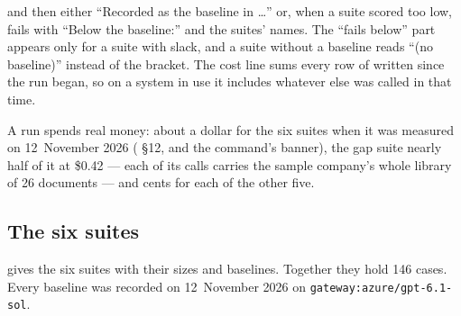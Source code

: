 \noindent and then either \enquote{Recorded as the baseline in \ldots} or, when a suite
scored too low, fails with \enquote{Below the baseline:} and the suites' names. The
\enquote{fails below} part appears only for a suite with slack, and a suite without a
baseline reads \enquote{(no baseline)} instead of the bracket. The cost line sums every row
of  written since the run began, so on a system in use it includes whatever
else was called in that time.

A run spends real money: about a dollar for the six suites when it was measured on
12~November 2026 ( §12, and the command's banner),
the gap suite nearly half of it at \$0.42 --- each of its calls carries the sample company's whole
library of 26 documents --- and cents for each of the other five.

\subsection{The six suites}\label{sec:control:suites}

 gives the six suites with their sizes and baselines. Together they
hold 146 cases. Every baseline was recorded on 12~November 2026 on
\texttt{gateway:azure/gpt-6.1-sol}.

